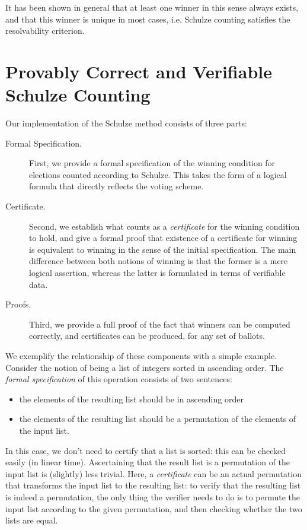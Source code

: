 \documentclass{llncs}
\begin{document}
It has been shown in general that at least one
winner in this sense always exists, and that this winner is unique
in most cases, i.e. Schulze counting satisfies the resolvability
criterion.


\section{Provably Correct and Verifiable Schulze Counting}
\label{sec:technical}

Our implementation of the Schulze method consists of three parts:
\begin{description}
\item [Formal Specification.] First, we provide a formal specification of the winning condition
for elections counted according to Schulze. This takes the form of a
logical formula that directly reflects the voting scheme.
\item [Certificate.] Second, we establish what counts as a
\emph{certificate} for the winning condition to hold, and give a formal
proof that existence of a certificate for winning is equivalent to
winning in the sense of the initial specification. The main
difference between both notions of winning is that the former is a
mere logical assertion, whereas the latter is formulated in terms of
verifiable data. 
\item [Proofs.] Third, we provide a full proof of
the fact that winners can be computed correctly, and certificates
can be produced, for any set of ballots.
\end{description}


\noindent
We exemplify the relationship of these components with a simple
example.
Consider the notion of being a list of integers sorted in ascending
order.  The \emph{formal specification} of this operation consists
of two sentences:
\begin{itemize}
\item the elements of the resulting list should be in ascending
order
\item the elements of the resulting list should be a permutation of
the elements of the input list.
\end{itemize}
In this case, we don't need to certify that a list is sorted: this
can be checked easily (in linear time). Ascertaining that the result
list is a permutation of the input list is (slightly) less trivial.
Here, a \emph{certificate} can be an actual permutation that
transforms the input list to the resulting list: to verify that the
resulting list is indeed a permutation, the only thing the verifier
needs to do is
to permute the input list according to the given
permutation, and then checking whether the two lists are equal. 
\end{document}
